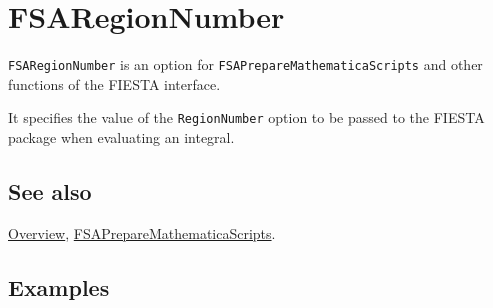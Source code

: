 \documentclass[../FeynHelpersManual.tex]{subfiles}
\begin{document}
\begin{Shaded}
\begin{Highlighting}[]
 
\end{Highlighting}
\end{Shaded}

\hypertarget{fsaregionnumber}{
\section{FSARegionNumber}\label{fsaregionnumber}}

\texttt{FSARegionNumber} is an option for
\texttt{FSAPrepareMathematicaScripts} and other functions of the FIESTA
interface.

It specifies the value of the \texttt{RegionNumber} option to be passed
to the FIESTA package when evaluating an integral.

\subsection{See also}

\hyperlink{toc}{Overview},
\hyperlink{fsapreparemathematicascripts}{FSAPrepareMathematicaScripts}.

\subsection{Examples}
\end{document}
